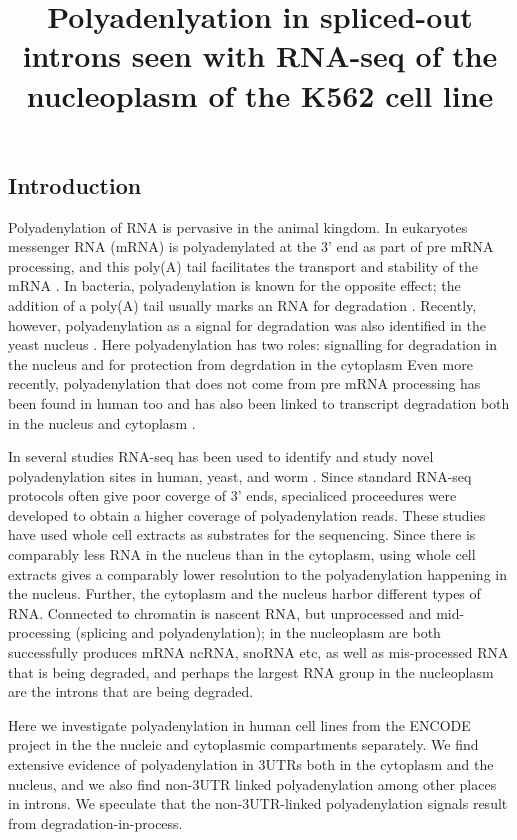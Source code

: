 \documentclass[a4paper]{article}
\title{Polyadenlyation in spliced-out introns seen with RNA-seq of the
nucleoplasm of the K562 cell line}
\begin{document}
 

\subsection{Introduction} Polyadenylation of RNA is pervasive in the animal
kingdom. In eukaryotes messenger RNA (mRNA) is polyadenylated at the 3' end as
part of pre mRNA processing, and this poly(A) tail facilitates the transport
and stability of the mRNA \cite{colgan_mechanism_1997}. In bacteria,
polyadenylation is known for the opposite effect; the addition of a poly(A)
tail usually marks an RNA for degradation
\cite{mohanty_bacterial/archaeal/organellar_2011}. Recently, however,
polyadenylation as a signal for degradation was also identified in the yeast
nucleus \cite{lacava_rna_2005} \cite{wyers_cryptic_2005}. Here polyadenylation
has two roles: signalling for degradation in the nucleus and for protection
from degrdation in the cytoplasm Even more recently, polyadenylation that does
not come from pre mRNA processing has been found in human too
\cite{lutz_alternative_2011} and has also been linked to transcript degradation
both in the nucleus and cytoplasm \cite{slomovic_addition_2010}.

In several studies RNA-seq has been used to identify and study novel
polyadenylation sites in human, yeast, and worm \cite{fu_differential_2011}
\cite{ozsolak_comprehensive_2010} \cite{mangone_landscape_2010}. Since standard
RNA-seq protocols often give poor coverge of 3' ends, specialiced proceedures
were developed \cite{ozsolak_comprehensive_2010} \cite{fu_differential_2011}
\cite{fox-walsh_multiplex_????} to obtain a higher coverage of polyadenylation
reads. These studies have used whole cell extracts as substrates for the
sequencing. Since there is comparably less RNA in the nucleus than in the
cytoplasm, using whole cell extracts gives a comparably lower resolution to the
polyadenylation happening in the nucleus. Further, the cytoplasm and the
nucleus harbor different types of RNA. Connected to chromatin is nascent RNA,
but unprocessed and mid-processing (splicing and polyadenylation); in the
nucleoplasm are both successfully produces mRNA ncRNA, snoRNA etc, as well as
mis-processed RNA that is being degraded, and perhaps the largest RNA group in
the nucleoplasm are the  introns that are being degraded.

Here we investigate polyadenylation in human cell lines from the ENCODE project
in the the nucleic and cytoplasmic compartments separately. We find extensive
evidence of polyadenylation in 3UTRs both in the cytoplasm and the nucleus, and
we also find non-3UTR linked polyadenylation among other places in introns. We
speculate that the non-3UTR-linked polyadenylation signals result from
degradation-in-process.
\end{document}
